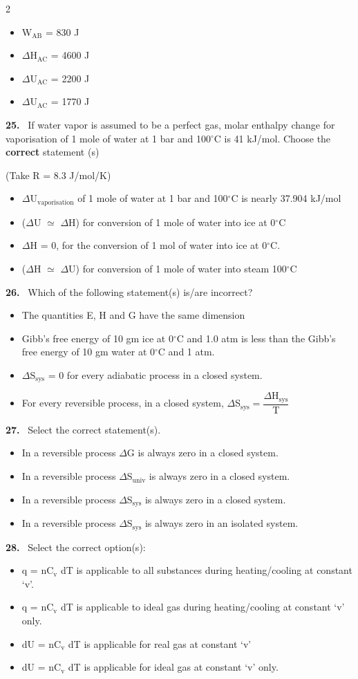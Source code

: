 \documentclass[10pt]{extarticle}
\newcommand{\qn}[1]{\par\smallskip\noindent\textbf{#1.}~}
\newenvironment{qoptions}{\begin{itemize}[leftmargin=1.8em,itemsep=1pt,topsep=2pt,label={}]}{\end{itemize}}
\newcommand{\opt}[2]{\item[(#1)] #2}
\begin{document}
\begin{multicols}{2}
\begin{qoptions}
\opt{A}{W$_\mathrm{AB}$ = 830 J}
\opt{B}{$\Delta$H$_\mathrm{AC}$ = 4600 J}
\opt{C}{$\Delta$U$_\mathrm{AC}$ = 2200 J}
\opt{D}{$\Delta$U$_\mathrm{AC}$ = 1770 J}
\end{qoptions}
\qn{25} If water vapor is assumed to be a perfect gas, molar enthalpy change for vaporisation of 1 mole of water at 1 bar and 100$^\circ$C is 41 kJ/mol. Choose the \textbf{correct} statement (s)\par
(Take R = 8.3 J/mol/K)
\begin{qoptions}
\opt{A}{$\Delta$U$_\mathrm{vaporisation}$ of 1 mole of water at 1 bar and 100$^\circ$C is nearly 37.904 kJ/mol}
\opt{B}{($\Delta$U $\simeq$ $\Delta$H) for conversion of 1 mole of water into ice at 0$^\circ$C}
\opt{C}{$\Delta$H = 0, for the conversion of 1 mol of water into ice at 0$^\circ$C.}
\opt{D}{($\Delta$H $\simeq$ $\Delta$U) for conversion of 1 mole of water into steam 100$^\circ$C}
\end{qoptions}
\qn{26} Which of the following statement(s) is/are incorrect?
\begin{qoptions}
\opt{A}{The quantities E, H and G have the same dimension}
\opt{B}{Gibb's free energy of 10 gm ice at 0$^\circ$C and 1.0 atm is less than the Gibb's free energy of 10 gm water at 0$^\circ$C and 1 atm.}
\opt{C}{$\Delta$S$_\mathrm{sys}$ = 0 for every adiabatic process in a closed system.}
\opt{D}{For every reversible process, in a closed system, $\Delta$S$_\mathrm{sys}=\dfrac{\Delta\mathrm H_\mathrm{sys}}{\mathrm T}$}
\end{qoptions}
\qn{27} Select the correct statement(s).
\begin{qoptions}
\opt{A}{In a reversible process $\Delta$G is always zero in a closed system.}
\opt{B}{In a reversible process $\Delta$S$_\mathrm{univ}$ is always zero in a closed system.}
\opt{C}{In a reversible process $\Delta$S$_\mathrm{sys}$ is always zero in a closed system.}
\opt{D}{In a reversible process $\Delta$S$_\mathrm{sys}$ is always zero in an isolated system.}
\end{qoptions}
\qn{28} Select the correct option(s):
\begin{qoptions}
\opt{A}{q = nC$_\mathrm v$ dT is applicable to all substances during heating/cooling at constant `v'.}
\opt{B}{q = nC$_\mathrm v$ dT is applicable to ideal gas during heating/cooling at constant `v' only.}
\opt{C}{dU = nC$_\mathrm v$ dT is applicable for real gas at constant `v'}
\opt{D}{dU = nC$_\mathrm v$ dT is applicable for ideal gas at constant `v' only.}

\end{qoptions}
\end{multicols}
\end{document}

